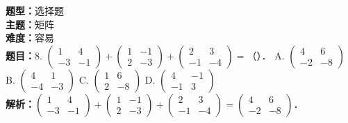 \documentclass{ctexart}
\newenvironment{question}[5]{%
	\noindent\textbf{题型：}#1\\
	\textbf{主题：}#2\\
	\textbf{难度：}#3\\
	\textbf{题目：}#4\\
	\textbf{解析：}#5\\
	\vspace{1em}
}{}
\begin{document}
	\begin{question}
		{选择题}
		{矩阵}
		{容易}
		{8. \(\left(\begin{array}{cc}1 & 4 \\ -3 & -1\end{array}\right)+\left(\begin{array}{cc}1 & -1 \\ 2 & -3\end{array}\right)+\left(\begin{array}{cc}2 & 3 \\ -1 & -4\end{array}\right)=\)（）．
			A. \(\left(\begin{array}{cc}4 & 6 \\ -2 & -8\end{array}\right)\)
			B. \(\left(\begin{array}{cc}4 & 1 \\ -4 & -3\end{array}\right)\)
			C. \(\left(\begin{array}{cc}1 & 6 \\ 2 & -8\end{array}\right)\)
			D. \(\left(\begin{array}{cc}4 & -1 \\ -1 & 3\end{array}\right)\)}
		{\(\left(\begin{array}{cc}1 & 4 \\ -3 & -1\end{array}\right)+\left(\begin{array}{cc}1 & -1 \\ 2&-3\end{array}\right)+\left(\begin{array}{cc}2&3\\-1&-4\end{array}\right)=\left(\begin{array}{cc}4 & 6 \\ -2 & -8\end{array}\right)\)．}
	\end{question}
	
\end{document}
